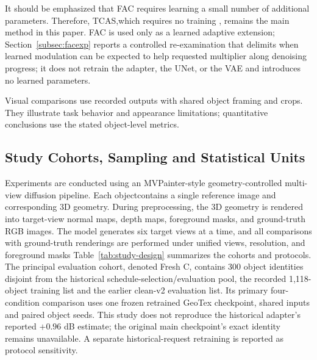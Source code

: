 \documentclass[times,twocolumn,final]{elsarticle}
\providecommand{\DIFadd}[1]{{\protect\color{blue} \sf #1}} %
\providecommand{\DIFdel}[1]{{\protect\color{red} \scriptsize #1}} %
\providecommand{\DIFaddbegin}{} %
\providecommand{\DIFaddend}{} %
\providecommand{\DIFdelbegin}{} %
\providecommand{\DIFdelend}{} %
\begin{document}
\DIFdel{It should be emphasized that FAC requires learning a small number of additional parameters. Therefore, TCAS,which requires no training , remains the main method in this paper. FAC is used only as a learned adaptive extension; Section~\ref{subsec:facexp} reports a controlled re-examination that delimits when learned modulation can be expected to help}\DIFdelend \DIFaddbegin \DIFadd{requested multiplier along denoising progress; it does not retrain the adapter, the UNet, or the VAE and introduces no learned parameters}\DIFaddend .

\DIFdelbegin %
\DIFdelend \DIFaddbegin \DIFadd{Visual comparisons use recorded outputs with shared object framing and crops. They illustrate task behavior and appearance limitations; quantitative conclusions use the stated object-level metrics.
}\DIFaddend 

\DIFdelbegin %
\DIFdelend \DIFaddbegin \subsection{Study Cohorts, Sampling and Statistical Units}
\DIFaddend \label{subsec:setup}

\DIFdelbegin %

\DIFdel{Experiments are conducted using an MVPainter-style geometry-controlled multi-view diffusion pipeline. Each objectcontains a single reference image and corresponding 3D geometry. During preprocessing, the 3D geometry is rendered into target-view normal maps, depth maps, foreground masks, and ground-truth RGB images. The model generates six target views at a time, and all comparisons with ground-truth renderings are performed under unified views, resolution, and foreground masks}\DIFdelend \DIFaddbegin \DIFadd{Table~\ref{tab:study-design} summarizes the cohorts and protocols. The principal evaluation cohort, denoted Fresh C, contains 300 object identities disjoint from the historical schedule-selection/evaluation pool, the recorded 1,118-object training list and the earlier clean-v2 evaluation list. Its primary four-condition comparison uses one frozen retrained GeoTex checkpoint, shared inputs and paired object seeds. This study does not reproduce the historical adapter's reported $+0.96$ dB estimate; the original main checkpoint's exact identity remains unavailable. A separate historical-request retraining is reported as protocol sensitivity}\DIFaddend .
\end{document}

